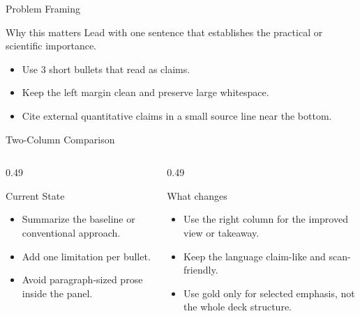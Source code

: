 \documentclass[12pt,aspectratio=169,xcolor={table}]{beamer}
\begin{document}
\begin{frame}{Problem Framing}
  \begin{block}{Why this matters}
    Lead with one sentence that establishes the practical or scientific importance.
  \end{block}

  \vspace{0.4cm}
  \begin{itemize}
    \item Use 3 short bullets that read as claims.
    \item Keep the left margin clean and preserve large whitespace.
    \item Cite external quantitative claims in a small source line near the bottom.
  \end{itemize}
\end{frame}

\begin{frame}{Two-Column Comparison}
  \begin{columns}[T,totalwidth=\textwidth]
    \begin{column}{0.49\textwidth}
      \begin{block}{Current State}
        \begin{itemize}
          \item Summarize the baseline or conventional approach.
          \item Add one limitation per bullet.
          \item Avoid paragraph-sized prose inside the panel.
        \end{itemize}
      \end{block}
    \end{column}
    \begin{column}{0.49\textwidth}
      \begin{highlightbox}{What changes}
        \begin{itemize}
          \item Use the right column for the improved view or takeaway.
          \item Keep the language claim-like and scan-friendly.
          \item Use gold only for selected emphasis, not the whole deck structure.
        \end{itemize}
      \end{highlightbox}
    \end{column}
  \end{columns}
\end{frame}
\end{document}

